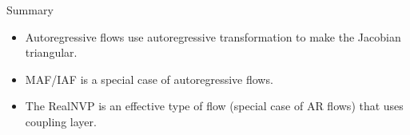 \begin{frame}{Summary}
	\begin{itemize}
		\item Autoregressive flows use autoregressive transformation to make the Jacobian triangular.
		\vfill
		\item MAF/IAF is a special case of autoregressive flows.
		\vfill
		\item The RealNVP is an effective type of flow (special case of AR flows) that uses coupling layer.
	\end{itemize}
\end{frame}
 